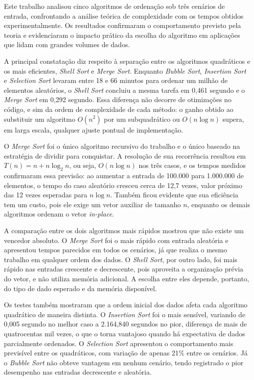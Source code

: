 
\qquad Este trabalho analisou cinco algoritmos de ordenação sob três cenários de entrada, confrontando a análise teórica de complexidade com os tempos obtidos experimentalmente. Os resultados confirmaram o comportamento previsto pela teoria e evidenciaram o impacto prático da escolha do algoritmo em aplicações que lidam com grandes volumes de dados.

\qquad A principal constatação diz respeito à separação entre os algoritmos quadráticos e os mais eficientes, \textit{Shell Sort} e \textit{Merge Sort}. Enquanto \textit{Bubble Sort}, \textit{Insertion Sort} e \textit{Selection Sort} levaram entre 18 e 66 minutos para ordenar um milhão de elementos aleatórios, o \textit{Shell Sort} concluiu a mesma tarefa em 0,461 segundo e o \textit{Merge Sort} em 0,292 segundo. Essa diferença não decorre de otimizações no código, e sim da ordem de complexidade de cada método: o ganho obtido ao substituir um algoritmo $O(n^2)$ por um subquadrático ou $O(n \log n)$ supera, em larga escala, qualquer ajuste pontual de implementação.

\qquad O \textit{Merge Sort} foi o único algoritmo recursivo do trabalho e o único baseado na estratégia de dividir para conquistar. A resolução de sua recorrência resultou em $T(n) = n + n \log_2 n$, ou seja, $O(n \log n)$ nos três casos, e os tempos medidos confirmaram essa previsão: ao aumentar a entrada de 100.000 para 1.000.000 de elementos, o tempo do caso aleatório cresceu cerca de 12,7 vezes, valor próximo das 12 vezes esperadas para $n \log n$. Também ficou evidente que sua eficiência tem um custo, pois ele exige um vetor auxiliar de tamanho $n$, enquanto os demais algoritmos ordenam o vetor \textit{in-place}.

\qquad A comparação entre os dois algoritmos mais rápidos mostrou que não existe um vencedor absoluto. O \textit{Merge Sort} foi o mais rápido com entrada aleatória e apresentou tempos parecidos em todos os cenários, já que realiza o mesmo trabalho em qualquer ordem dos dados. O \textit{Shell Sort}, por outro lado, foi mais rápido nas entradas crescente e decrescente, pois aproveita a organização prévia do vetor, e não utiliza memória adicional. A escolha entre eles depende, portanto, do tipo de dado esperado e da memória disponível.

\qquad Os testes também mostraram que a ordem inicial dos dados afeta cada algoritmo quadrático de maneira distinta. O \textit{Insertion Sort} foi o mais sensível, variando de 0,005 segundo no melhor caso a 2.164,840 segundos no pior, diferença de mais de quatrocentas mil vezes, o que o torna vantajoso quando há expectativa de dados parcialmente ordenados. O \textit{Selection Sort} apresentou o comportamento mais previsível entre os quadráticos, com variação de apenas 21\% entre os cenários. Já o \textit{Bubble Sort} não obteve vantagem em nenhum cenário, tendo registrado o pior desempenho nas entradas decrescente e aleatória.

